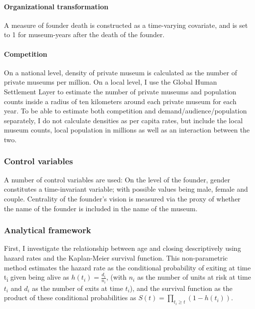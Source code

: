 \documentclass[12pt]{article}
\begin{document}
\paragraph*{Organizational transformation}
\label{sec:org671fa45}
A measure of founder death is constructed as a time-varying covariate, and is set to 1 for museum-years after the death of the founder. 

\paragraph*{Competition}
\label{sec:orgc059910}
On a national level, density of private museum is calculated as the number of private museums per million.
On a local level, I use the Global Human Settlement Layer \parencite{EC_2023_GHSL} to estimate the number of private museums and population counts inside a radius of ten kilometers around each private museum for each year.
To be able to estimate both competition and demand/audience/population separately, I do not calculate densities as per capita rates, but include the local museum counts, local population in millions as well as an interaction between the two.

\subsubsection*{Control variables}
\label{sec:org4412539}

\bigbreak
\noindent
A number of control variables are used: 
On the level of the founder, gender constitutes a time-invariant variable; with possible values being male, female and couple.
Centrality of the founder's vision is measured via the proxy of whether the name of the founder is included in the name of the museum.








\subsubsection*{Analytical framework}
\label{sec:orge4889f4}


First, I investigate the relationship between age and closing descriptively using hazard rates and the Kaplan-Meier survival function.
This non-parametric method estimates the hazard rate as the conditional probability of exiting at time t\textsubscript{i} given being alive as \(h(t_i) = \frac{d_i}{n_i}\), (with \(n_i\) as the number of units at risk at time \(t_i\) and \(d_i\) as the number of exits at time \(t_i\)), and the survival function as the product of these conditional probabilities as \(S(t) = \prod_{t_i \geq t} \left(1-h(t_i) \right)\).
\end{document}
